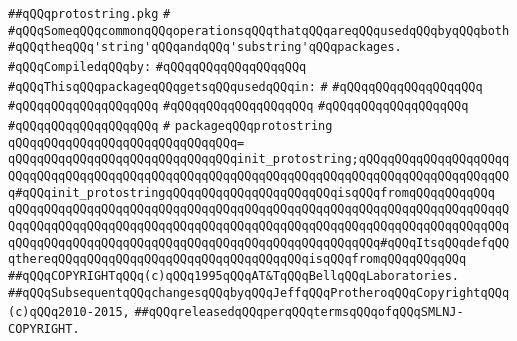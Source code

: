 \label{src/lib/std/src/protostring.pkg}
\verb|##qQQqprotostring.pkg|\newline
\verb|#|\newline
\verb|#qQQqSomeqQQqcommonqQQqoperationsqQQqthatqQQqareqQQqusedqQQqbyqQQqboth|\newline
\verb|#qQQqtheqQQq'string'qQQqandqQQq'substring'qQQqpackages.|\newline
\newline
\verb|#qQQqCompiledqQQqby:|\newline
\verb|#qQQqqQQqqQQqqQQqqQQq|\newline
\newline
\verb|#qQQqThisqQQqpackageqQQqgetsqQQqusedqQQqin:|\newline
\verb|#|\newline
\verb|#qQQqqQQqqQQqqQQqqQQq|\newline
\verb|#qQQqqQQqqQQqqQQqqQQq|\newline
\verb|#qQQqqQQqqQQqqQQqqQQq|\newline
\verb|#qQQqqQQqqQQqqQQqqQQq|\newline
\verb|#qQQqqQQqqQQqqQQqqQQq|\newline
\verb|#|\newline
\verb|packageqQQqprotostring|\newline
\verb|qQQqqQQqqQQqqQQqqQQqqQQqqQQqqQQq=|\newline
\verb|qQQqqQQqqQQqqQQqqQQqqQQqqQQqqQQqinit_protostring;qQQqqQQqqQQqqQQqqQQqqQQqqQQqqQQqqQQqqQQqqQQqqQQqqQQqqQQqqQQqqQQqqQQqqQQqqQQqqQQqqQQqqQQqqQQq#qQQqinit_protostringqQQqqQQqqQQqqQQqqQQqqQQqisqQQqfromqQQqqQQqqQQq|\newline
\verb|qQQqqQQqqQQqqQQqqQQqqQQqqQQqqQQqqQQqqQQqqQQqqQQqqQQqqQQqqQQqqQQqqQQqqQQqqQQqqQQqqQQqqQQqqQQqqQQqqQQqqQQqqQQqqQQqqQQqqQQqqQQqqQQqqQQqqQQqqQQqqQQqqQQqqQQqqQQqqQQqqQQqqQQqqQQqqQQqqQQqqQQqqQQqqQQq#qQQqItsqQQqdefqQQqthereqQQqqQQqqQQqqQQqqQQqqQQqqQQqqQQqqQQqisqQQqfromqQQqqQQqqQQq|\newline
\newline
\verb|##qQQqCOPYRIGHTqQQq(c)qQQq1995qQQqAT&TqQQqBellqQQqLaboratories.|\newline
\verb|##qQQqSubsequentqQQqchangesqQQqbyqQQqJeffqQQqProtheroqQQqCopyrightqQQq(c)qQQq2010-2015,|\newline
\verb|##qQQqreleasedqQQqperqQQqtermsqQQqofqQQqSMLNJ-COPYRIGHT.|\newline

